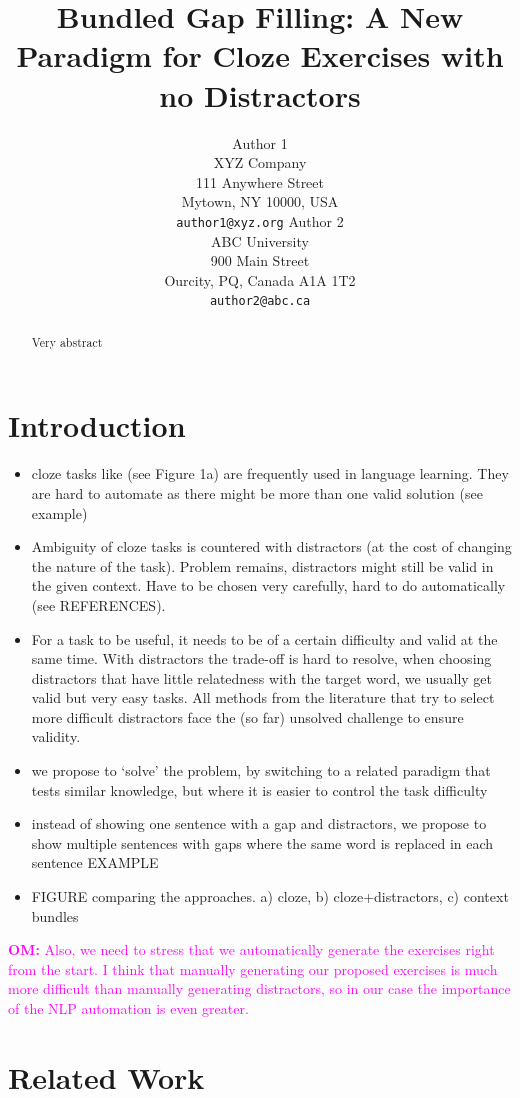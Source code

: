 \documentclass[11pt,letterpaper]{article}
\title{Bundled Gap Filling: A New Paradigm for Cloze Exercises with no Distractors}
\author{Author 1\\
	    XYZ Company\\
	    111 Anywhere Street\\
	    Mytown, NY 10000, USA\\
	    {\tt author1@xyz.org}
	  \And
	Author 2\\
  	ABC University\\
  	900 Main Street\\
  	Ourcity, PQ, Canada A1A 1T2\\
  {\tt author2@abc.ca}}
\date{}
\newcommand{\om}[1]{\textcolor{magenta}{\textbf{OM:} #1}}
\newcommand{\om}[1]{}
\begin{document}
\maketitle

\begin{abstract}
Very abstract
\end{abstract}

\section{Introduction}
\begin{itemize}
	\item cloze tasks like (see Figure 1a) are frequently used in language learning. They are hard to automate as there might be more than one valid solution (see example)
	\item Ambiguity of cloze tasks is countered with distractors (at the cost of changing the nature of the task). Problem remains, distractors might still be valid in the given context. Have to be chosen very carefully, hard to do automatically (see REFERENCES).
	\item For a task to be useful, it needs to be of a certain difficulty and valid at the same time. With distractors the trade-off is hard to resolve, when choosing distractors that have little relatedness with the target word, we usually get valid but very easy tasks. All methods from the literature that try to select more difficult distractors face the (so far) unsolved challenge to ensure validity.
	\item we propose to `solve' the problem, by switching to a related paradigm that tests similar knowledge, but where it is easier to control the task difficulty
	\item instead of showing one sentence with a gap and distractors, we propose to show multiple sentences with gaps where the same word is replaced in each sentence EXAMPLE
	\item FIGURE comparing the approaches. a) cloze, b) cloze+distractors, c) context bundles
\end{itemize}

\om{Also, we need to stress that we automatically generate the exercises right from the start. I think that manually generating our proposed exercises is much more difficult than manually generating distractors, so in our case the importance of the NLP automation is even greater.}

\section{Related Work}
\end{document}
